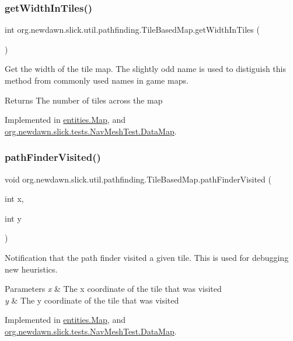 \subsubsection{\texorpdfstring{get\+Width\+In\+Tiles()}{getWidthInTiles()}}
{\footnotesize\ttfamily int org.\+newdawn.\+slick.\+util.\+pathfinding.\+Tile\+Based\+Map.\+get\+Width\+In\+Tiles (\begin{DoxyParamCaption}{ }\end{DoxyParamCaption})}

Get the width of the tile map. The slightly odd name is used to distiguish this method from commonly used names in game maps.

\begin{DoxyReturn}{Returns}
The number of tiles across the map 
\end{DoxyReturn}


Implemented in \mbox{\hyperlink{classentities_1_1_map_a7caa160e4dd0164e861ad238cc58ac36}{entities.\+Map}}, and \mbox{\hyperlink{classorg_1_1newdawn_1_1slick_1_1tests_1_1_nav_mesh_test_1_1_data_map_a9c463e2f4c3c3c208961d40e40529cb3}{org.\+newdawn.\+slick.\+tests.\+Nav\+Mesh\+Test.\+Data\+Map}}.

\mbox{\label{interfaceorg_1_1newdawn_1_1slick_1_1util_1_1pathfinding_1_1_tile_based_map_aeb1c1b5cbb0aecc4e280dbe18d5af5ac}} 
\subsubsection{\texorpdfstring{path\+Finder\+Visited()}{pathFinderVisited()}}
{\footnotesize\ttfamily void org.\+newdawn.\+slick.\+util.\+pathfinding.\+Tile\+Based\+Map.\+path\+Finder\+Visited (\begin{DoxyParamCaption}\item[{int}]{x,  }\item[{int}]{y }\end{DoxyParamCaption})}

Notification that the path finder visited a given tile. This is used for debugging new heuristics.


\begin{DoxyParams}{Parameters}
{\em x} & The x coordinate of the tile that was visited \\
\hline
{\em y} & The y coordinate of the tile that was visited \\
\hline
\end{DoxyParams}


Implemented in \mbox{\hyperlink{classentities_1_1_map_a0ad9c4406c9c9de0cfd6dfbf4acdd924}{entities.\+Map}}, and \mbox{\hyperlink{classorg_1_1newdawn_1_1slick_1_1tests_1_1_nav_mesh_test_1_1_data_map_af2bca0a48cb72d6e19d4c6e4ffcd6dba}{org.\+newdawn.\+slick.\+tests.\+Nav\+Mesh\+Test.\+Data\+Map}}.

